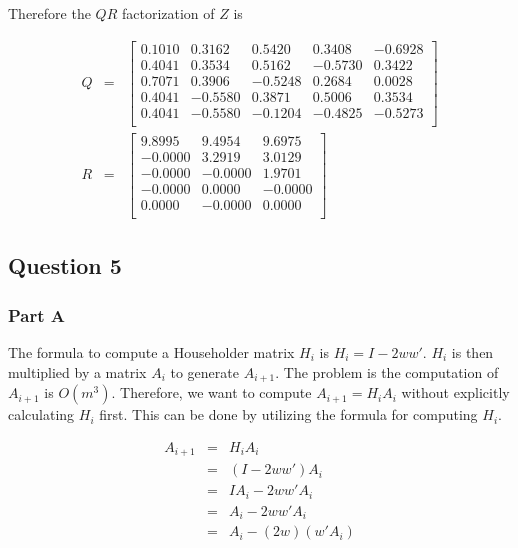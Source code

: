 Therefore the \(QR\) factorization of \(Z\) is

\begin{eqnarray}
  Q &=&
  \begin{bmatrix}
    0.1010 &   0.3162 &   0.5420 &   0.3408 &  -0.6928 \\
    0.4041 &   0.3534 &   0.5162 &  -0.5730 &   0.3422 \\
    0.7071 &   0.3906 &  -0.5248 &   0.2684 &   0.0028 \\
    0.4041 &  -0.5580 &   0.3871 &   0.5006 &   0.3534 \\
    0.4041 &  -0.5580 &  -0.1204 &  -0.4825 &  -0.5273 \\
  \end{bmatrix}
  \\
  R &=& 
  \begin{bmatrix}
    9.8995 &   9.4954 &   9.6975 \\
   -0.0000 &   3.2919 &   3.0129 \\
   -0.0000 &  -0.0000 &   1.9701 \\
   -0.0000 &   0.0000 &  -0.0000 \\
    0.0000 &  -0.0000 &   0.0000 \\
  \end{bmatrix}
\end{eqnarray}

\newpage


\newpage
\subsection{Question 5}

\subsubsection{Part A}

The formula to compute a Householder matrix \(H_i\) is \(H_i = I - 2ww'\).
\(H_i\) is then multiplied by a matrix \(A_i\) to generate \(A_{i+1}\).
The problem is the computation of \(A_{i+1}\) is \(O(m^{3})\).
Therefore, we want to compute \(A_{i+1} = H_i A_i\) without explicitly calculating \(H_i\) first.
This can be done by utilizing the formula for computing \(H_i\).

\begin{eqnarray}
  A_{i+1} &=& H_i A_i \\
  &=& (I - 2ww')A_i \\
  &=& I A_i  - 2ww'A_i \\
  &=& A_i - 2ww' A_i \\
  &=& \boxed{A_i - (2w)(w'A_i)}
\end{eqnarray}

